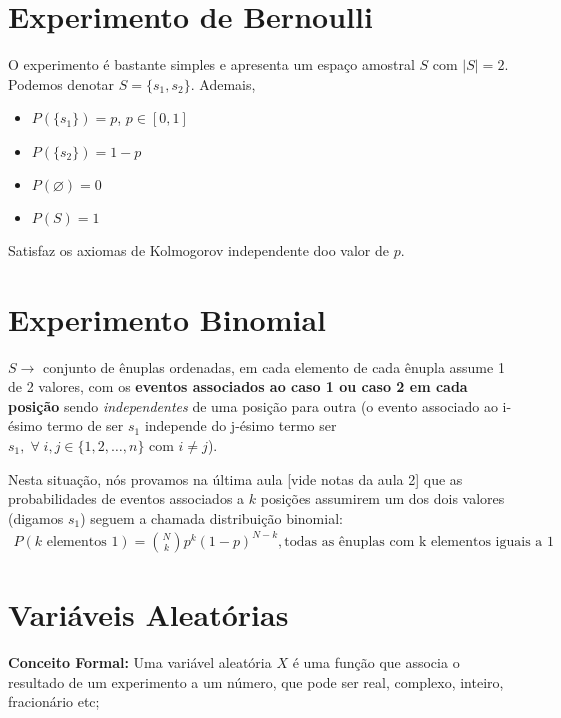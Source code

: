 \documentclass{article}
\renewcommand\bf[1]{\textbf{#1}}
\renewcommand\it[1]{\textit{#1}}
\newcommand{\vn}{\varnothing}
\begin{document}
\setlength{\abovedisplayskip}{12pt}
\setlength{\belowdisplayskip}{12pt}
\setlength{\abovedisplayshortskip}{0pt}
\setlength{\belowdisplayshortskip}{0pt}
\setlength{\jot}{0pt}

\section{Experimento de Bernoulli}
O experimento é bastante simples e apresenta um espaço amostral $S$ com $|S| = 2$. Podemos denotar
$S = \{s_1,s_2\}$. Ademais,

\begin{itemize}[noitemsep,topsep=0pt]
    \item $P(\{s_1\}) = p$, $p \in [0,1]$
    \item $P(\{s_2\}) = 1 - p$
    \item $P(\vn) = 0$
    \item $P(S) = 1$
\end{itemize}
Satisfaz os axiomas de Kolmogorov independente doo valor de $p$.
\\
\section{Experimento Binomial}
$S \rightarrow$ conjunto de ênuplas ordenadas, em cada elemento de cada ênupla assume 1 de 2
valores, com os \bf{eventos associados ao caso 1 ou caso 2 em cada posição} sendo
\it{independentes} de uma posição para outra (o evento associado ao i-ésimo termo de ser $s_1$
independe do j-ésimo termo ser $s_1, \; \forall \; i,j \in \{1,2,\ldots,n\} \text{ com } i \neq
j$).

Nesta situação, nós provamos na última aula [vide notas da aula 2] que as probabilidades de eventos
associados a $k$ posições assumirem um dos dois valores (digamos $s_1$) seguem a chamada
distribuição binomial:
\begin{align*}
P(k \text{ elementos } 1) = {N \choose k} p^k (1-p)^{N-k}, \text{todas as ênuplas com k elementos iguais a 1}
\end{align*}

\vspace{-0.5em}
\section{Variáveis Aleatórias}
\bf{Conceito Formal:} Uma variável aleatória $X$ é uma função que associa o resultado de um
experimento a um número, que pode ser real, complexo, inteiro, fracionário etc;
\end{document}
